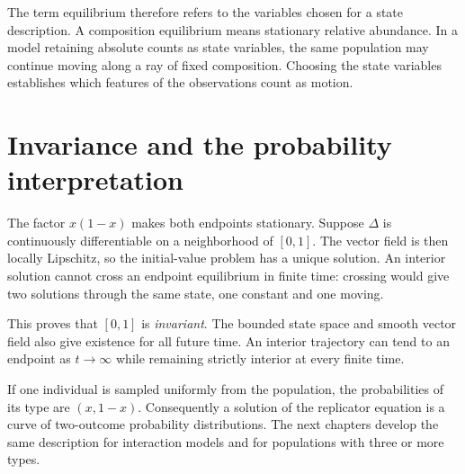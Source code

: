 \documentclass[11pt,oneside,openany]{book}
\theoremstyle{definition}
\theoremstyle{remark}
\numberwithin{equation}{chapter}
\begin{document}
The term equilibrium therefore refers to the variables chosen for a state description. A composition equilibrium means stationary relative abundance. In a model retaining absolute counts as state variables, the same population may continue moving along a ray of fixed composition. Choosing the state variables establishes which features of the observations count as motion.

\section{Invariance and the probability interpretation}
The factor $x(1-x)$ makes both endpoints stationary. Suppose $\Delta$ is continuously differentiable on a neighborhood of $[0,1]$. The vector field is then locally Lipschitz, so the initial-value problem has a unique solution. An interior solution cannot cross an endpoint equilibrium in finite time: crossing would give two solutions through the same state, one constant and one moving.

This proves that $[0,1]$ is \emph{invariant}. The bounded state space and smooth vector field also give existence for all future time. An interior trajectory can tend to an endpoint as $t\to\infty$ while remaining strictly interior at every finite time.

If one individual is sampled uniformly from the population, the probabilities of its type are $(x,1-x)$. Consequently a solution of the replicator equation is a curve of two-outcome probability distributions. The next chapters develop the same description for interaction models and for populations with three or more types.

\FloatBarrier
\end{document}
